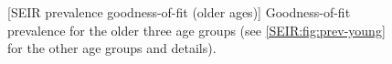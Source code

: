 \documentclass[thesis.tex]{subfiles}
\begin{document}
\begin{figure}
    \vspace{-3cm}
    \captionsetup{width=0.8\paperwidth}
    [SEIR prevalence goodness-of-fit (older ages)]{%
        Goodness-of-fit prevalence for the older three age groups (see \cref{SEIR:fig:prev-young} for the other age groups and details).
    }
    \label{SEIR:fig:prev-old}
\end{figure}
\end{document}
